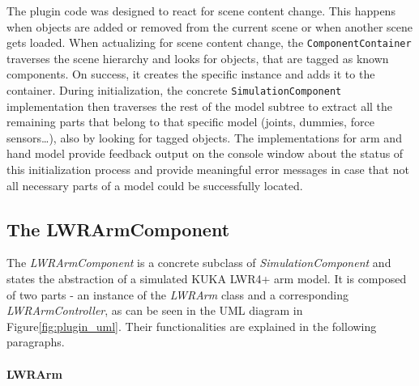 The plugin code was designed to react for scene content change. This happens when objects are added or removed from the current scene or when another scene gets loaded. When actualizing for scene content change, the \texttt{ComponentContainer} traverses the scene hierarchy and looks for objects, that are tagged as known components. On success, it creates the specific instance and adds it to the container. During initialization, the concrete \texttt{SimulationComponent} implementation then traverses the rest of the model subtree to extract all the remaining parts that belong to that specific model (joints, dummies, force sensors\ldots), also by looking for tagged objects. The implementations for arm and hand model provide feedback output on the console window about the status of this initialization process and provide meaningful error messages in case that not all necessary parts of a model could be successfully located.



\subsection{The LWRArmComponent}

The \emph{LWRArmComponent} is a concrete subclass of \emph{SimulationComponent} and states the abstraction of a simulated KUKA LWR4+ arm model. It is composed of two parts - an instance of the \emph{LWRArm} class and a corresponding \emph{LWRArmController}, as can be seen in the UML diagram in Figure\ref{fig:plugin_uml}. Their functionalities are explained in the following paragraphs.

\paragraph{LWRArm}

